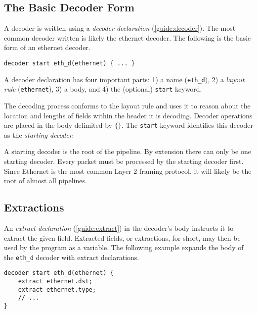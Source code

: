 \subsection{The Basic Decoder Form} \label{tut:basic_decoder}

A decoder is written using a \textit{decoder declaration} (\ref{guide:decoder}).
The most common decoder written is likely the ethernet decoder. The following
is the basic form of an ethernet decoder.

\begin{codepage}
\begin{lstlisting}
decoder start eth_d(ethernet) { ... }
\end{lstlisting}
\end{codepage}

A decoder declaration has four important parts: 
1) a name (\texttt{eth\_d}), 
2) a \textit{layout rule} (\texttt{ethernet}),
3) a body, and
4) the (optional) \texttt{start} keyword.

The decoding process conforms to the layout rule and uses it to reason
about the location and lengths of fields within the header it is decoding.
Decoder operations are placed in the body delimited by $\lbrace\rbrace$.
The \texttt{start} keyword identifies this decoder as the \emph{starting
decoder}. 

A starting decoder is the root of the pipeline.
By extension there can only be one starting decoder.
Every packet must be processed by the starting decoder first.
Since Ethernet is the most common Layer 2 framing protocol, it will
likely be the root of almost all pipelines.

\subsection{Extractions} \label{tut:decoder_extract}

An \textit{extract declaration} (\ref{guide:extract}) in the decoder's body
instructs it to extract the given field. Extracted fields, or extractions,
for short, may then be used by the program as a variable.
The following example expands the body of the \texttt{eth\_d} decoder 
with extract declarations.

\begin{codepage}
\begin{lstlisting}
decoder start eth_d(ethernet) {
	extract ethernet.dst;
	extract ethernet.type;
	// ...
}
\end{lstlisting}
\end{codepage}

